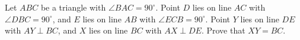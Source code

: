 Let $ABC$ be a triangle with $\angle BAC=90^\circ$. Point $D$ lies on line $AC$ with $\angle DBC=90^\circ$, and $E$ lies on line $AB$ with $\angle ECB=90^\circ$. Point $Y$ lies on line $DE$ with $AY\perp BC$, and $X$ lies on line $BC$ with $AX\perp DE$. Prove that $XY=BC$.
